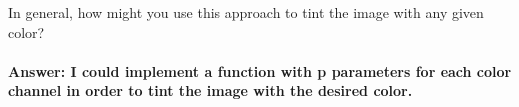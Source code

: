 \documentclass[11pt]{article}
\begin{document}
    In general, how might you use this approach to tint the image with any
given color?

\hypertarget{answer-i-could-implement-a-function-with-p-parameters-for-each-color-channel-in-order-to-tint-the-image-with-the-desired-color.}{%
\paragraph{Answer: I could implement a function with p parameters for
each color channel in order to tint the image with the desired
color.}\label{answer-i-could-implement-a-function-with-p-parameters-for-each-color-channel-in-order-to-tint-the-image-with-the-desired-color.}}


    
    
    
    
\end{document}
